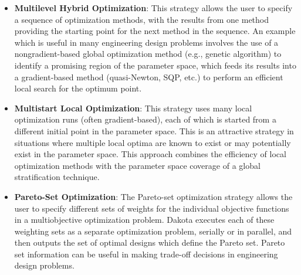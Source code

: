 \begin{itemize}
\item \textbf{Multilevel Hybrid Optimization}: This strategy allows
  the user to specify a sequence of optimization methods, with the
  results from one method providing the starting point for the next
  method in the sequence. An example which is useful in many
  engineering design problems involves the use of a nongradient-based
  global optimization method (e.g., genetic algorithm) to identify a
  promising region of the parameter space, which feeds its results
  into a gradient-based method (quasi-Newton, SQP, etc.) to perform an
  efficient local search for the optimum point.

\item \textbf{Multistart Local Optimization}: This strategy uses many
  local optimization runs (often gradient-based), each of which is
  started from a different initial point in the parameter space. This
  is an attractive strategy in situations where multiple local optima
  are known to exist or may potentially exist in the parameter
  space. This approach combines the efficiency of local optimization
  methods with the parameter space coverage of a global stratification
  technique.

\item \textbf{Pareto-Set Optimization}: The Pareto-set optimization
  strategy allows the user to specify different sets of weights for
  the individual objective functions in a multiobjective optimization
  problem. Dakota executes each of these weighting sets as a separate
  optimization problem, serially or in parallel, and then outputs the
  set of optimal designs which define the Pareto set. Pareto set
  information can be useful in making trade-off decisions in
  engineering design problems.
\end{itemize}


